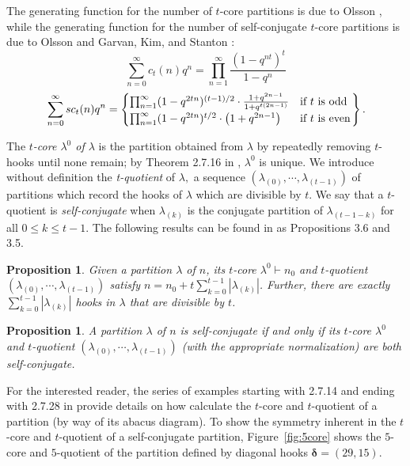 \documentclass[12pt,leqno]{amsart}
\newtheorem{prop}[lem]{Proposition}
\numberwithin{equation}{section}
\theoremstyle{definition}
\begin{document}
The generating function for the number of $t$-core partitions is due to Olsson \cite[Proposition~3.3]{Olsson76}, while the generating function for the number of self-conjugate $t$-core partitions is due to Olsson \cite[Equation~(2.40)]{Olsson90} and Garvan, Kim, and Stanton \cite[Equation~(7.1)]{Garvan}: 
\begin{equation}
\sum_{n=0}^\infty c_t(n)q^n=\prod_{n=1}^\infty \frac{(1-q^{nt})^t}{1-q^n}
\end{equation}
\begin{equation}
\left.\sum_{n=0}^\infty sc_t(n)q^n=
\begin{cases}
\prod_{n=1}^\infty(1-q^{2tn})^{(t-1)/2}\cdot\frac{1+q^{2n-1}}{1+q^{t(2n-1)}} & \textup{if $t$ is odd}\\
\prod_{n=1}^\infty(1-q^{2tn})^{t/2}\cdot\big(1+q^{2n-1}\big) & \textup{if $t$ is even}\\
\end{cases}
\right\}.
\label{eq:scgf}
\end{equation}

The {\it $t$-core $\lambda^0$ of $\lambda$} is the partition obtained from $\lambda$ by repeatedly removing $t$-hooks until none remain; by Theorem 2.7.16 in \cite{JamesKerber}, ${\lambda}^0$ is unique.  We introduce without definition the {\it t-quotient} of $\lambda,$ a sequence $(\lambda_{(0)},\cdots,\lambda_{(t-1)})$ of partitions which record the hooks of $\lambda$ which are divisible by $t$. We say that a $t$-quotient is {\em self-conjugate} when  $\lambda_{(k)}$ is the conjugate partition of $\lambda_{(t-1-k)}$ for all $0\leq k\leq t-1$.  The following results can be found in \cite{Olsson1} as Propositions 3.6 and 3.5.

\begin{prop} Given a partition $\lambda$ of $n$, its $t$-core $\lambda^0\vdash n_0$ and $t$-quotient\newline $(\lambda_{(0)},\cdots,\lambda_{(t-1)})$ satisfy $n=n_0 + t\sum_{k=0}^{t-1}|\lambda_{(k)}|$. Further, there are exactly $\sum_{k=0}^{t-1}|\lambda_{(k)}|$ hooks in $\lambda$ that are divisible by $t$.
\end{prop}
\begin{prop}\label{symquo} 
A partition $\lambda$ of $n$ is self-conjugate if and only if its $t$-core $\lambda^0$ and $t$-quotient $(\lambda_{(0)},\cdots,\lambda_{(t-1)})$ (with the appropriate normalization) are both self-conjugate.
\end{prop}
For the interested reader, the series of examples starting with 2.7.14 and ending with 2.7.28 in \cite{JamesKerber} provide details on how calculate the $t$-core and $t$-quotient of a partition (by way of its abacus diagram).  To show the symmetry inherent in the $t$-core and $t$-quotient of a self-conjugate partition, Figure~\ref{fig:5core} shows the $5$-core and $5$-quotient of the partition defined by diagonal hooks $\boldsymbol\delta=(29,15)$.
\end{document}
